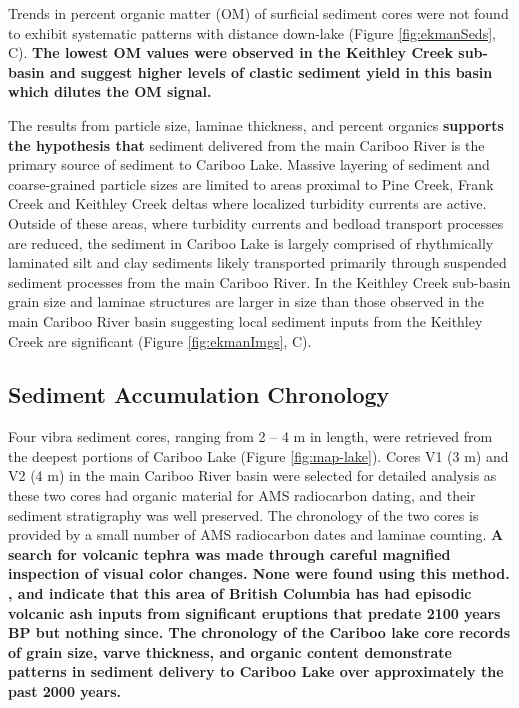 \documentclass[Royal,times,doublespace,sageh]{sagej}
\begin{document}
Trends in percent organic matter (OM) of surficial sediment cores were
not found to exhibit systematic patterns with distance down-lake (Figure
\ref{fig:ekmanSeds}, C). \textbf{The lowest OM values were observed in
the Keithley Creek sub-basin and suggest higher levels of clastic
sediment yield in this basin which dilutes the OM signal.}

The results from particle size, laminae thickness, and percent organics
\textbf{supports the hypothesis that} sediment delivered from the main
Cariboo River is the primary source of sediment to Cariboo Lake. Massive
layering of sediment and coarse-grained particle sizes are limited to
areas proximal to Pine Creek, Frank Creek and Keithley Creek deltas
where localized turbidity currents are active. Outside of these areas,
where turbidity currents and bedload transport processes are reduced,
the sediment in Cariboo Lake is largely comprised of rhythmically
laminated silt and clay sediments likely transported primarily through
suspended sediment processes from the main Cariboo River. In the
Keithley Creek sub-basin grain size and laminae structures are larger in
size than those observed in the main Cariboo River basin suggesting
local sediment inputs from the Keithley Creek are significant (Figure
\ref{fig:ekmanImgs}, C).

\hypertarget{sediment-accumulation-chronology}{%
\subsection{Sediment Accumulation
Chronology}\label{sediment-accumulation-chronology}}

Four vibra sediment cores, ranging from 2 -- 4 m in length, were
retrieved from the deepest portions of Cariboo Lake (Figure
\ref{fig:map-lake}). Cores V1 (3 m) and V2 (4 m) in the main Cariboo
River basin were selected for detailed analysis as these two cores had
organic material for AMS radiocarbon dating, and their sediment
stratigraphy was well preserved. The chronology of the two cores is
provided by a small number of AMS radiocarbon dates and laminae
counting. \textbf{A search for volcanic tephra was made through careful
magnified inspection of visual color changes. None were found using this
method. \citet{Westgate1977}, \citet{Hallett1997} and
\citet{Maurer2012b} indicate that this area of British Columbia has had
episodic volcanic ash inputs from significant eruptions that predate
2100 years BP but nothing since. The chronology of the Cariboo lake core
records of grain size, varve thickness, and organic content demonstrate
patterns in sediment delivery to Cariboo Lake over approximately the
past 2000 years.}
\end{document}
